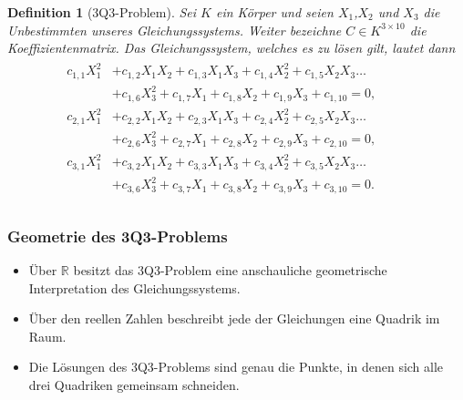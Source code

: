\documentclass[11pt]{beamer}
\newcommand{\R}{{\mathbb R}}
\theoremstyle{custom}
\theoremstyle{custom}
\newtheorem{dfn}[theorem]{Definition}
\begin{document}
	\begin{frame}
		\begin{dfn}[3Q3-Problem]\pause
			Sei $K$ ein Körper und seien $X_1$,$X_{2}$ und $X_{3}$ die Unbestimmten unseres Gleichungssystems. Weiter bezeichne $C \in K^{3\times 10}$ die Koeffizientenmatrix. Das Gleichungssystem, welches es zu lösen gilt, lautet dann
			\begin{gather}\label{eqn:3Q3}
				\begin{alignedat}{4}
					c_{1,1}X_{1}^2&+c_{1,2}X_{1}X_{2}+c_{1,3}X_{1}X_{3}+c_{1,4}X_{2}^2+c_{1,5}X_{2}X_{3}\ldots&&&\\&+c_{1,6}X_{3}^2+c_{1,7}X_{1}+c_{1,8}X_{2}+c_{1,9}X_{3}+c_{1,10}=0,\\
					c_{2,1}X_{1}^2&+c_{2,2}X_{1}X_{2}+c_{2,3}X_{1}X_{3}+c_{2,4}X_{2}^2+c_{2,5}X_{2}X_{3}\ldots&&&\\&+c_{2,6}X_{3}^2+c_{2,7}X_{1}+c_{2,8}X_{2}+c_{2,9}X_{3}+c_{2,10}=0,\\
					c_{3,1}X_{1}^2&+c_{3,2}X_{1}X_{2}+c_{3,3}X_{1}X_{3}+c_{3,4}X_{2}^2+c_{3,5}X_{2}X_{3}\ldots&&&\\&+c_{3,6}X_{3}^2+c_{3,7}X_{1}+c_{3,8}X_{2}+c_{3,9}X_{3}+c_{3,10}=0.\\
				\end{alignedat}
			\end{gather}
		\end{dfn}
	\end{frame}
	\begin{frame}
		\frametitle{Geometrie des 3Q3-Problems}
		\begin{itemize}
			\pause
			\item Über $\R$ besitzt das 3Q3-Problem eine anschauliche geometrische Interpretation des Gleichungssystems.
			\pause
			\item Über den reellen Zahlen beschreibt jede der Gleichungen eine Quadrik im Raum.
			\pause
			\item Die Lösungen des 3Q3-Problems sind genau die Punkte, in denen sich alle drei Quadriken gemeinsam schneiden.
		\end{itemize}
	\end{frame}
\end{document}
